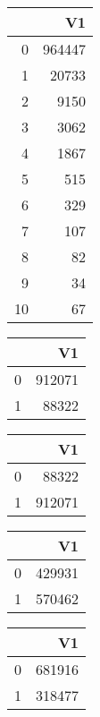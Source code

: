 \bigskip\bigskip
\centering
\begin{tabular}{rr}
  \hline
 & V1 \\ 
  \hline
0 & 964447 \\ 
  1 & 20733 \\ 
  2 & 9150 \\ 
  3 & 3062 \\ 
  4 & 1867 \\ 
  5 & 515 \\ 
  6 & 329 \\ 
  7 & 107 \\ 
  8 &  82 \\ 
  9 &  34 \\ 
  10 &  67 \\ 
   \hline
\end{tabular}

\bigskip\bigskip
\centering
\begin{tabular}{rr}
  \hline
 & V1 \\ 
  \hline
0 & 912071 \\ 
  1 & 88322 \\ 
   \hline
\end{tabular}

\bigskip\bigskip
\centering
\begin{tabular}{rr}
  \hline
 & V1 \\ 
  \hline
0 & 88322 \\ 
  1 & 912071 \\ 
   \hline
\end{tabular}

\bigskip\bigskip
\centering
\begin{tabular}{rr}
  \hline
 & V1 \\ 
  \hline
0 & 429931 \\ 
  1 & 570462 \\ 
   \hline
\end{tabular}

\bigskip\bigskip
\centering
\begin{tabular}{rr}
  \hline
 & V1 \\ 
  \hline
0 & 681916 \\ 
  1 & 318477 \\ 
   \hline
\end{tabular}

